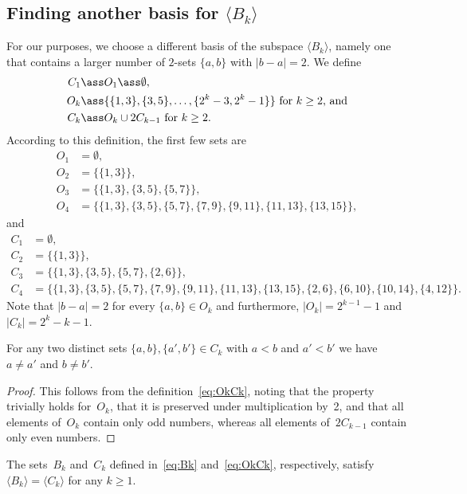 \subsection{Finding another basis for $\langle B_k\rangle$}
%
For our purposes, we choose a different basis of the subspace $\langle B_k\rangle$, namely one that contains a larger number of $2$-sets $\{a,b\}$ with $|b-a|=2$.
We define
\begin{equation}
\label{eq:OkCk}
\begin{split}
C_1&\ass O_1\ass \emptyset,\\
O_k&\ass \{\{1,3\},\{3,5\},\ldots,\{2^k-3,2^k-1\}\} \text{ for $k\geq 2$, and} \\
C_k& \ass O_k\cup 2C_{k-1} \text{ for } k\geq 2.
\end{split}
\end{equation}
According to this definition, the first few sets are
\[
\begin{split}
O_1&=\emptyset, \\
O_2&=\{\{1,3\}\}, \\
O_3&=\{\{1,3\},\{3,5\},\{5,7\}\}, \\
O_4&=\{\{1,3\},\{3,5\},\{5,7\},\{7,9\},\{9,11\},\{11,13\},\{13,15\}\},
\end{split}
\]
and
\[
\label{eq:C14}
\begin{split}
C_1&=\emptyset, \\
C_2&=\{\{1,3\}\}, \\
C_3&=\{\{1,3\},\{3,5\},\{5,7\},\{2,6\}\}, \\
C_4&=\{\{1,3\},\{3,5\},\{5,7\},\{7,9\},\{9,11\},\{11,13\},\{13,15\},\{2,6\},\{6,10\},\{10,14\},\{4,12\}\}.
\end{split}
\]
%
Note that $|b-a|=2$ for every $\{a,b\}\in O_k$ and furthermore, $|O_k|=2^{k-1}-1$ and $|C_k|=2^k-k-1$.
%
\begin{lemma}
\label{lem:Cdiff}
For any two distinct sets $\{a,b\},\{a',b'\}\in C_k$ with $a<b$ and $a'<b'$ we have $a \ne a'$ and $b\ne b'$.
\end{lemma}
%
\begin{proof}
This follows from the definition~\eqref{eq:OkCk}, noting that the property trivially holds for~$O_k$, that it is preserved under multiplication by~2, and that all elements of~$O_k$ contain only odd numbers, whereas all elements of~$2C_{k-1}$ contain only even numbers.
\end{proof}
%
\begin{lemma}
\label{lem:BkCk}
The sets~$B_k$ and~$C_k$ defined in~\eqref{eq:Bk} and~\eqref{eq:OkCk}, respectively, satisfy $\langle B_k\rangle=\langle C_k\rangle$ for any $k\geq 1$.
\end{lemma}
